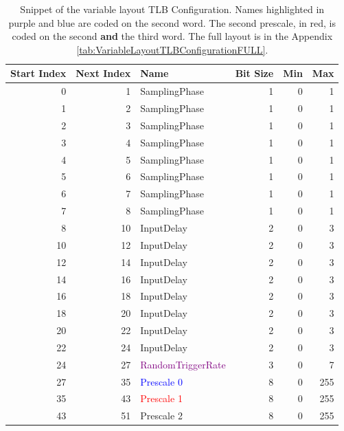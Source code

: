 \begin{table}[htbp]
  \centering
  \caption{Snippet of the variable layout TLB Configuration. Names highlighted in purple and blue are coded on the second word. The second prescale, in red, is coded on the second \textbf{and} the third word. The full layout is in the Appendix \ref{tab:VariableLayoutTLBConfigurationFULL}.}
    \begin{tabular}{rrlrrr}
    \toprule
    \multicolumn{1}{l}{Start Index} & \multicolumn{1}{l}{Next Index} & Name  & \multicolumn{1}{l}{Bit Size} & \multicolumn{1}{l}{Min} & \multicolumn{1}{l}{Max} \\
    \midrule
    0     & 1     & SamplingPhase & 1     & 0     & 1 \\
    1     & 2     & SamplingPhase & 1     & 0     & 1 \\
    2     & 3     & SamplingPhase & 1     & 0     & 1 \\
    3     & 4     & SamplingPhase & 1     & 0     & 1 \\
    4     & 5     & SamplingPhase & 1     & 0     & 1 \\
    5     & 6     & SamplingPhase & 1     & 0     & 1 \\
    6     & 7     & SamplingPhase & 1     & 0     & 1 \\
    7     & 8     & SamplingPhase & 1     & 0     & 1 \\
    8     & 10    & InputDelay & 2     & 0     & 3 \\
    10    & 12    & InputDelay & 2     & 0     & 3 \\
    12    & 14    & InputDelay & 2     & 0     & 3 \\
    14    & 16    & InputDelay & 2     & 0     & 3 \\
    16    & 18    & InputDelay & 2     & 0     & 3 \\
    18    & 20    & InputDelay & 2     & 0     & 3 \\
    20    & 22    & InputDelay & 2     & 0     & 3 \\
    22    & 24    & InputDelay & 2     & 0     & 3 \\
    24    & 27    & \textcolor{purple}{RandomTriggerRate} & 3     & 0     & 7 \\
    27    & 35    & \textcolor{blue}{Prescale 0} & 8     & 0     & 255 \\
    35    & 43    & \textcolor{red}{Prescale 1} & 8     & 0     & 255 \\
    43    & 51    & Prescale 2 & 8     & 0     & 255 \\
    \bottomrule
    \end{tabular}
  \label{tab:VariableLayoutTLBConfigurationSNIPET}
\end{table}

